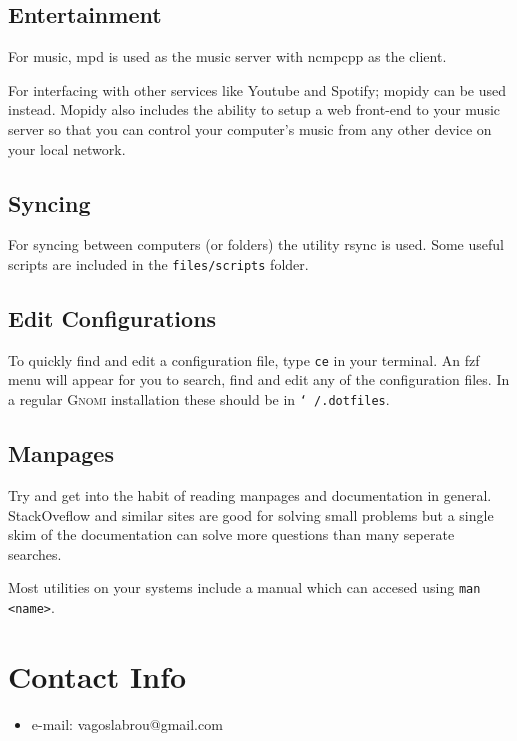 \documentclass{article}
\newcommand{\ttt}[1]{\texttt{#1}}
\newcommand{\sys}{\textsc{Gnomi}\xspace}
\begin{document}
\subsection{Entertainment}
For music, mpd is used as the music server with ncmpcpp
as the client. 

For interfacing with other services like Youtube and Spotify;
mopidy can be used instead. Mopidy also includes the ability to setup a web front-end to your music server 
so that you can control your computer's music from any other device on your local network.

\subsection{Syncing}

For syncing between computers (or folders) the utility rsync is used. 
Some useful scripts are included in the \ttt{files/scripts} folder.

\subsection{Edit Configurations}

To quickly find and edit a configuration file, type 
\ttt{ce} in your terminal. An fzf menu will appear for you 
to search, find and edit any of the configuration files. 
In a regular \sys installation these should be 
in \ttt{\char`~/.dotfiles}.

\subsection{Manpages}

Try and get into the habit of reading manpages and documentation in general.
StackOveflow and similar sites are good for solving small problems but a single 
skim of the documentation can solve more questions than many seperate searches.

Most utilities on your systems include a manual which can accesed using \ttt{man <name>}.


\section{Contact Info}

\begin{itemize}
    \item e-mail: vagoslabrou@gmail.com
\end{itemize}

\end{document}
